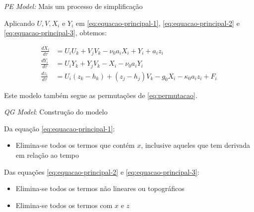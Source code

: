 
\begin{frame}{\textit{PE Model:} Mais um processo de simplificação}

Aplicando $U, V, X_i$ e $Y_i$ em \eqref{eq:equacao-principal-1}, \eqref{eq:equacao-principal-2} e \eqref{eq:equacao-principal-3}, obtemos:

\begin{align}
    \frac{dX_i}{d\tau} &= U_iU_k + V_jV_k - \nu_0a_iX_i + Y_i + a_iz_i \label{eq:equacao-principal-simplificada-1}\\
    \frac{dY_i}{d\tau} &= U_iY_k + Y_jV_k - X_i - \nu_0a_iY_i \label{eq:equacao-principal-simplificada-2}\\
    \frac{dz_i}{d\tau} &= U_i(z_k - h_k) + (z_j - h_j)V_k - g_0X_i - \kappa_0a_iz_i + F_i \label{eq:equacao-principal-simplificada-3}
\end{align}

Este modelo também segue as permutações de \eqref{eq:permutacao}.

\end{frame}


\begin{frame}{\textit{QG Model}: Construção do modelo}

Da equação \eqref{eq:equacao-principal-1}:
\begin{itemize}
    \item Elimina-se todos os termos que contém $x$, inclusive aqueles que tem derivada em relação ao tempo
\end{itemize}

Das equações \eqref{eq:equacao-principal-2} e \eqref{eq:equacao-principal-3}:
\begin{itemize}
    \item Elimina-se todos os termos não lineares ou topográficos 
    \item Elimina-se todos os termos com $x$ e $z$
\end{itemize}

\end{frame}


